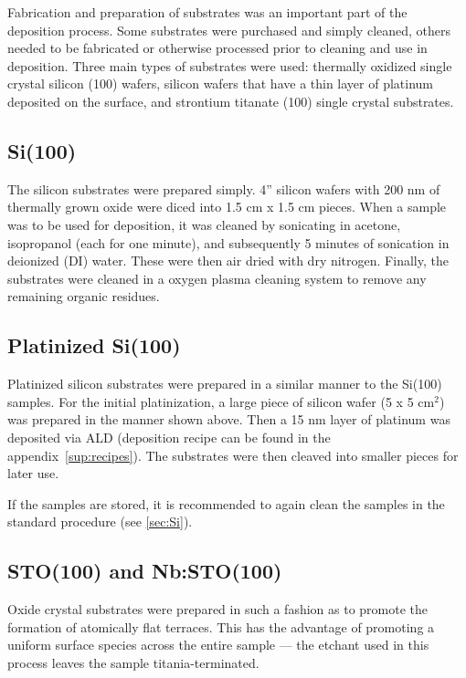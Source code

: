 Fabrication and preparation of substrates was an important part of the deposition process. Some substrates were purchased and simply cleaned, others needed to be fabricated or otherwise processed prior to cleaning and use in deposition. Three main types of substrates were used: thermally oxidized single crystal silicon (100) wafers, silicon wafers that have a thin layer of platinum deposited on the surface, and strontium titanate (100) single crystal substrates. 

\subsection{Si(100)} \label{sec:Si}

The silicon substrates were prepared simply. 4'' silicon wafers with 200 nm of thermally grown oxide were diced into 1.5 cm x 1.5 cm pieces. When a sample was to be used for deposition, it was cleaned by sonicating in acetone, isopropanol (each for one minute), and subsequently 5 minutes of sonication in deionized (DI) water. These were then air dried with dry nitrogen. Finally, the substrates were cleaned in a oxygen plasma cleaning system to remove any remaining organic residues. 



\subsection{Platinized Si(100)}

Platinized silicon substrates were prepared in a similar manner to the Si(100) samples. For the initial platinization, a large piece of silicon wafer (5 x 5 cm$^{2}$) was prepared in the manner shown above. Then a 15 nm layer of platinum was deposited via ALD (deposition recipe can be found in the appendix~\vref{sup:recipes}). The substrates were then cleaved into smaller pieces for later use. 

If the samples are stored, it is recommended to again clean the samples in the standard procedure (see \vref{sec:Si}).


\subsection{STO(100) and Nb:STO(100)}

Oxide crystal substrates were prepared in such a fashion as to promote the formation of atomically flat terraces. This has the advantage of promoting a uniform surface species across the entire sample --- the etchant used in this process leaves the sample titania-terminated. 

